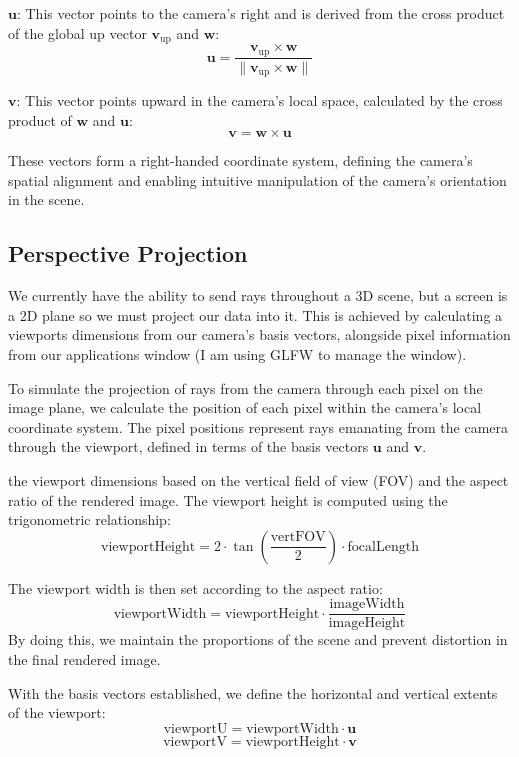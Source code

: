 \documentclass[12pt]{article}
\begin{document}
\(\mathbf{u}\): This vector points to the camera's right and is derived from the cross product of the global up vector \(\mathbf{v}_{\text{up}}\) and \(\mathbf{w}\):
\[
    \mathbf{u} = \frac{\mathbf{v}_{\text{up}} \times \mathbf{w}}{\|\mathbf{v}_{\text{up}} \times \mathbf{w}\|}
\]

\(\mathbf{v}\): This vector points upward in the camera's local space, calculated by the cross product of \(\mathbf{w}\) and \(\mathbf{u}\):
\[
    \mathbf{v} = \mathbf{w} \times \mathbf{u}
\]

These vectors form a right-handed coordinate system, defining the camera's spatial alignment and enabling intuitive manipulation of the camera's orientation in the scene.

\subsection{Perspective Projection}
We currently have the ability to send rays throughout a 3D scene, but a screen is a 2D plane so we must project our data into it. This is achieved by calculating a viewports dimensions from our camera's basis vectors, alongside pixel information from our applications window (I am using GLFW to manage the window).

To simulate the projection of rays from the camera through each pixel on the image plane, we calculate the position of each pixel within the camera's local coordinate system. The pixel positions represent rays emanating from the camera through the viewport, defined in terms of the basis vectors \(\mathbf{u}\) and \(\mathbf{v}\).

the viewport dimensions based on the vertical field of view (FOV) and the aspect ratio of the rendered image. The viewport height is computed using the trigonometric relationship:
\[
    \text{viewportHeight} = 2 \cdot \tan\left(\frac{\text{vertFOV}}{2}\right) \cdot \text{focalLength}
\]

The viewport width is then set according to the aspect ratio:
\[ \text{viewportWidth} = \text{viewportHeight} \cdot \frac{\text{imageWidth}}{\text{imageHeight}}
\] By doing this, we maintain the proportions of the scene and prevent distortion in the final rendered image.

With the basis vectors established, we define the horizontal  and vertical  extents of the viewport:
\[
    \text{viewportU} = \text{viewportWidth} \cdot \mathbf{u}
\]
\[
    \text{viewportV} = \text{viewportHeight} \cdot \mathbf{v}
\]
\end{document}
